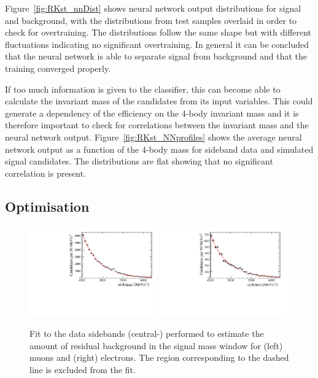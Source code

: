 Figure~\ref{fig:RKst_nnDist} shows neural network output distributions for signal and background, with
the distributions from test samples overlaid in order to check for overtraining. 
The distributions follow the same shape but with different fluctuations indicating no
significant overtraining. In general it can be concluded that the neural network is able to separate signal
from background and that the training converged properly.

If too much information is given to the classifier, this can become able to calculate the invariant mass of the candidates 
from its input variables. This could generate a dependency of the efficiency on the 4-body invariant mass and it is therefore 
important to check for correlations between the invariant mass and the neural network output. Figure~\ref{fig:RKst_NNprofiles} 
shows the average neural network output as a function of the 4-body mass for sideband data and simulated signal candidates. 
The distributions are flat showing that no significant correlation is present.


\subsection{Optimisation}
\label{sec:optimisation}

\begin{figure}[t!]
\centering
\includegraphics[width=0.49\textwidth]{RKst/figs/Optimisation/optimizeCut_MM-q2central/fitB_MM_0.pdf}
\includegraphics[width=0.49\textwidth]{RKst/figs/Optimisation/optimizeCut_EE-q2central/fitB_EE_0.pdf}
\caption{Fit to the data sidebands (central-\qsq) performed to estimate the amount of residual background in the
signal mass window for (left) muons and (right) electrons. 
The region corresponding to the dashed line is excluded from the fit.}
\label{fig:sideband_fit}
\end{figure}

